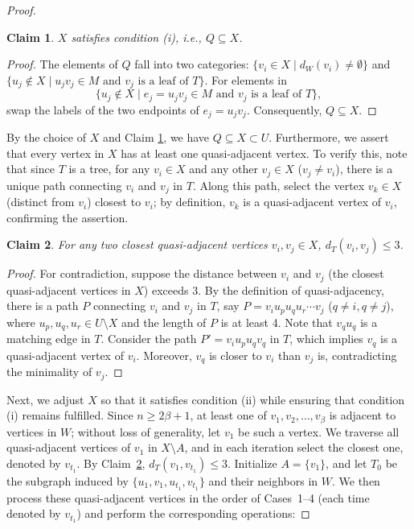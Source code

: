 \documentclass[12pt]{amsart}
\newtheorem{claim}{Claim}[section]
\begin{document}
\begin{proof}
\begin{claim}\label{clm-2.3}
\(X\) satisfies condition (i), i.e., \(Q \subseteq X\).
\end{claim}

\begin{proof}
The elements of \(Q\) fall into two categories: \(\{v_i \in X \mid d_W(v_i) \neq \emptyset\}\) and \(\{u_j \notin X \mid u_jv_j \in M \text{ and } v_j \text{ is a leaf of } T\}\). For elements in \[\{u_j \notin X \mid e_j = u_jv_j \in M \text{ and } v_j \text{ is a leaf of } T\},\] swap the labels of the two endpoints of \(e_j = u_jv_j\). Consequently, \(Q \subseteq X\).
\end{proof}

By the choice of \(X\) and Claim \ref{clm-2.3}, we have \(Q \subseteq X \subset U\). Furthermore, we assert that every vertex in \(X\) has at least one quasi-adjacent vertex. To verify this, note that since \(T\) is a tree, for any \(v_i \in X\) and any other \(v_j \in X\) (\(v_j \neq v_i\)), there is a unique path connecting \(v_i\) and \(v_j\) in \(T\). Along this path, select the vertex \(v_k \in X\) (distinct from \(v_i\)) closest to \(v_i\); by definition, \(v_k\) is a quasi-adjacent vertex of \(v_i\), confirming the assertion.

\begin{claim}\label{claim-2.6}
For any two closest quasi-adjacent vertices \(v_i, v_j \in X\), \(d_T(v_i, v_j) \leq 3\).
\end{claim}

\begin{proof}
For contradiction, suppose the distance between \(v_i\) and \(v_j\) (the closest quasi-adjacent vertices in \(X\)) exceeds 3. 
By the definition of quasi-adjacency, there is a path \(P\) connecting \(v_i\) and \(v_j\) in \(T\), 
say \(P = v_iu_pu_qu_r\cdots v_j\) (\(q \neq i, q \neq j\)), where \(u_p, u_q, u_r \in U \setminus X\) 
and the length of \(P\) is at least 4. Note that \(v_qu_q\) is a matching edge in \(T\). 
Consider the path \(P' = v_iu_pu_qv_q\) in \(T\), which implies \(v_q\) is a quasi-adjacent vertex of \(v_i\). 
Moreover, \(v_q\) is closer to \(v_i\) than \(v_j\) is, contradicting the minimality of \(v_j\). 
\end{proof}


Next, we adjust $X$ so that it satisfies condition (ii) while ensuring that condition (i) remains fulfilled. Since \(n \geq 2\beta + 1\), at least one of \(v_1, v_2, \ldots, v_\beta\) is adjacent to vertices in \(W\); without loss of generality, let \(v_1\) be such a vertex. 
We traverse all quasi-adjacent vertices of \(v_1\) in \(X \setminus A\), 
and in each iteration select the closest one, denoted by \(v_{t_1}\). 
By Claim~\ref{claim-2.6}, \(d_T(v_1, v_{t_1}) \le 3\). 
Initialize \(A = \{v_1\}\), and let \(T_0\) be the subgraph induced by \(\{u_1, v_1, u_{t_1}, v_{t_1}\}\) and their neighbors in \(W\).
We then process these quasi-adjacent vertices in the order of Cases~1--4 
(each time denoted by \(v_{t_1}\)) and perform the corresponding operations:



\end{proof}
\end{document}
